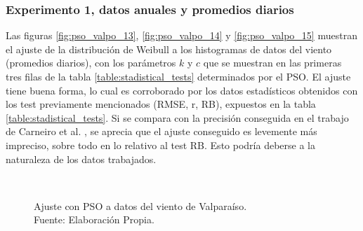 \subsubsection{Experimento 1, datos anuales y promedios diarios}
Las figuras \ref{fig:pso_valpo_13}, \ref{fig:pso_valpo_14} y \ref{fig:pso_valpo_15} muestran el ajuste de la distribución de Weibull a los histogramas de datos del viento (promedios diarios), con los parámetros $k$ y $c$  que se muestran en las primeras tres filas de la tabla \ref{table:stadistical_tests} determinados por el PSO. El ajuste tiene buena forma, lo cual es corroborado por los datos estadísticos obtenidos con los test previamente mencionados (RMSE, r, RB), expuestos en la tabla \ref{table:stadistical_tests}. Si se compara con la precisión conseguida en el trabajo de Carneiro et al. \cite{Carneiro15}, se aprecia que el ajuste conseguido es levemente más impreciso, sobre todo en lo relativo al test RB. Esto podría deberse a la naturaleza de los datos 
trabajados.\\
\begin{figure}[ht!]
    \centering
    \captionsetup{justification=centering,margin=2cm}
        \\
    \caption{Ajuste con PSO a datos del viento de Valparaíso.\\ Fuente: Elaboración Propia.}
    \label{fig:subfigures}
\end{figure}

